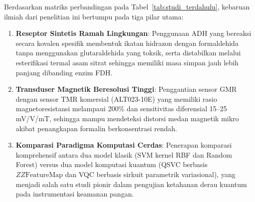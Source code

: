 Berdasarkan matriks perbandingan pada Tabel~\ref{tab:studi_terdahulu}, kebaruan ilmiah dari penelitian ini bertumpu pada tiga pilar utama:
\begin{enumerate}
    \item \textbf{Reseptor Sintetis Ramah Lingkungan}: Penggunaan ADH yang bereaksi secara kovalen spesifik membentuk ikatan hidrazon dengan formaldehida tanpa menggunakan glutaraldehida yang toksik, serta distabilkan melalui esterifikasi termal asam sitrat sehingga memiliki masa simpan jauh lebih panjang dibanding enzim FDH.
    \item \textbf{Transduser Magnetik Beresolusi Tinggi}: Penggantian sensor GMR dengan sensor TMR komersial (ALT023-10E) yang memiliki rasio magnetoresistansi melampaui 200\% dan sensitivitas diferensial 15--25 mV/V/mT, sehingga mampu mendeteksi distorsi medan magnetik mikro akibat penangkapan formalin berkonsentrasi rendah.
    \item \textbf{Komparasi Paradigma Komputasi Cerdas}: Penerapan komparasi komprehensif antara dua model klasik (SVM kernel RBF dan Random Forest) versus dua model komputasi kuantum (QSVC berbasis $ZZ\text{FeatureMap}$ dan VQC berbasis sirkuit parametrik variasional), yang menjadi salah satu studi pionir dalam pengujian ketahanan derau kuantum pada instrumentasi keamanan pangan.
\end{enumerate}